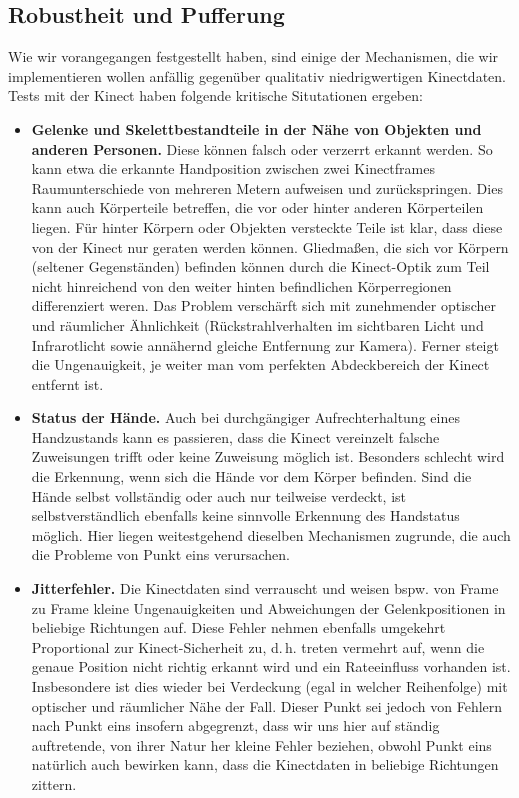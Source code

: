 	\subsection{Robustheit und Pufferung}\label{sec:robustheit}
	Wie wir vorangegangen festgestellt haben, sind einige der Mechanismen, die wir implementieren wollen anfällig gegenüber qualitativ niedrigwertigen Kinectdaten. Tests mit der Kinect haben folgende kritische Situtationen ergeben:
	\begin{itemize}
		\item \textbf{Gelenke und Skelettbestandteile in der Nähe von Objekten und anderen Personen.} Diese können falsch oder verzerrt erkannt werden. So kann etwa die erkannte Handposition zwischen zwei Kinectframes Raumunterschiede von mehreren Metern aufweisen und zurückspringen. Dies kann auch Körperteile betreffen, die vor oder hinter anderen Körperteilen liegen. Für hinter Körpern oder Objekten versteckte Teile ist klar, dass diese von der Kinect nur geraten werden können. Gliedmaßen, die sich vor Körpern (seltener Gegenständen) befinden können durch die Kinect-Optik zum Teil nicht hinreichend von den weiter hinten befindlichen Körperregionen differenziert weren. Das Problem verschärft sich mit zunehmender optischer und räumlicher Ähnlichkeit (Rückstrahlverhalten im sichtbaren Licht und Infrarotlicht sowie annähernd gleiche Entfernung zur Kamera). Ferner steigt die Ungenauigkeit, je weiter man vom \glqq perfekten Abdeckbereich\grqq{} der Kinect entfernt ist.
		\item \textbf{Status der Hände.} Auch bei durchgängiger Aufrechterhaltung eines Handzustands kann es passieren, dass die Kinect vereinzelt falsche Zuweisungen trifft oder keine Zuweisung möglich ist. Besonders schlecht wird die Erkennung, wenn sich die Hände vor dem Körper befinden. Sind die Hände selbst vollständig oder auch nur teilweise verdeckt, ist selbstverständlich ebenfalls keine sinnvolle Erkennung des Handstatus möglich. Hier liegen weitestgehend dieselben Mechanismen zugrunde, die auch die Probleme von Punkt eins verursachen.  
		\item \textbf{Jitterfehler.} Die Kinectdaten sind verrauscht und weisen bspw. von Frame zu Frame kleine Ungenauigkeiten und Abweichungen der Gelenkpositionen in beliebige Richtungen auf. Diese Fehler nehmen ebenfalls umgekehrt Proportional zur Kinect-Sicherheit zu, d.\,h. treten vermehrt auf, wenn die genaue Position nicht richtig erkannt wird und ein \glqq Rateeinfluss\grqq{} vorhanden ist. Insbesondere ist dies wieder bei Verdeckung (egal in welcher Reihenfolge) mit optischer und räumlicher Nähe der Fall. Dieser Punkt sei jedoch von Fehlern nach Punkt eins insofern abgegrenzt, dass wir uns hier auf ständig auftretende, von ihrer Natur her kleine Fehler beziehen, obwohl Punkt eins natürlich auch bewirken kann, dass die Kinectdaten in beliebige Richtungen \glqq zittern\grqq{}.

\end{itemize}
